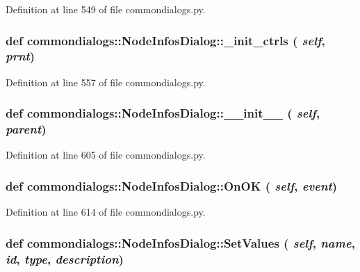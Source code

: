Definition at line 549 of file commondialogs.py.\hypertarget{classcommondialogs_1_1NodeInfosDialog_103b344ad0af9db40eec62456dbf864c}{
\subsubsection[\_\-init\_\-ctrls]{\setlength{\rightskip}{0pt plus 5cm}def commondialogs::Node\-Infos\-Dialog::\_\-init\_\-ctrls ( {\em self},  {\em prnt})}}
\label{classcommondialogs_1_1NodeInfosDialog_103b344ad0af9db40eec62456dbf864c}




Definition at line 557 of file commondialogs.py.\hypertarget{classcommondialogs_1_1NodeInfosDialog_c95f7d4082146239f9278432c3efa6cd}{
\subsubsection[\_\-\_\-init\_\-\_\-]{\setlength{\rightskip}{0pt plus 5cm}def commondialogs::Node\-Infos\-Dialog::\_\-\_\-init\_\-\_\- ( {\em self},  {\em parent})}}
\label{classcommondialogs_1_1NodeInfosDialog_c95f7d4082146239f9278432c3efa6cd}




Definition at line 605 of file commondialogs.py.\hypertarget{classcommondialogs_1_1NodeInfosDialog_28e8dfedd00152d5b389a19f9cf0167f}{
\subsubsection[OnOK]{\setlength{\rightskip}{0pt plus 5cm}def commondialogs::Node\-Infos\-Dialog::On\-OK ( {\em self},  {\em event})}}
\label{classcommondialogs_1_1NodeInfosDialog_28e8dfedd00152d5b389a19f9cf0167f}




Definition at line 614 of file commondialogs.py.\hypertarget{classcommondialogs_1_1NodeInfosDialog_36750076ce1d98da4682c16bc9c00f74}{
\subsubsection[SetValues]{\setlength{\rightskip}{0pt plus 5cm}def commondialogs::Node\-Infos\-Dialog::Set\-Values ( {\em self},  {\em name},  {\em id},  {\em type},  {\em description})}}
\label{classcommondialogs_1_1NodeInfosDialog_36750076ce1d98da4682c16bc9c00f74}




